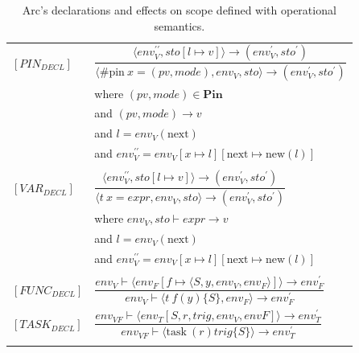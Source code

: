 \begin{table}[htb!]
    \centering
    \begin{tabular}{ll}
        \toprule
        $[PIN_{DECL}]$  & $\dfrac
            {\langle env^{\prime\prime}_V, sto[l \mapsto v] \rangle \rightarrow (env^\prime_V, sto^\prime)}
            {\langle \text{\#pin} \ x = (pv, mode), env_V, sto\rangle\rightarrow (env^\prime_V, sto^\prime)}$ \\ [12pt]
                        & where $(pv, mode) \in \textbf{Pin} $                                                \\
                        & and $(pv,mode) \rightarrow v $                                                      \\
                        & and $l = env_V(\text{next})$                                                        \\
                        & and $env^{\prime\prime}_V = env_V[x \mapsto l][\text{next} \mapsto \text{new}(l)] $ \\
        \\

        $[VAR_{DECL}]$  & $\dfrac
            {\langle env^{\prime\prime}_V, sto[l \mapsto v] \rangle \rightarrow (env^\prime_V, sto^\prime)}
            {\langle t \ x = expr, env_V, sto\rangle\rightarrow (env^\prime_V, sto^\prime)}$                  \\ [12pt]
                        & where $env_V, sto \vdash expr \rightarrow v $                                       \\
                        & and $l = env_V(\text{next})$                                                        \\
                        & and $env^{\prime\prime}_V = env_V[x \mapsto l][\text{next} \mapsto \text{new}(l)] $ \\
        \\

        $[FUNC_{DECL}]$ & $\dfrac
            {env_V \vdash \langle env_F[f \mapsto \langle S, y, env_V, env_F\rangle] \rangle \rightarrow env^\prime_F}
            {env_V \vdash \langle t \ f (y) \{S \}, env_F \rangle \rightarrow env^\prime_F}$                  \\ [12pt]

        $[TASK_{DECL}]$ & $\dfrac
            {env_{VF}\vdash \langle env_T[S, r, trig, env_V, envF] \rangle \rightarrow env^\prime_T}
            {env_{VF}\vdash \langle \text{task} \ (r) trig \{S\} \rangle \rightarrow env^\prime_T}$           \\
        \\
        \bottomrule
    \end{tabular}
    \caption{Arc's declarations and effects on scope defined with operational semantics.}
    \label{tab:arcscoperules}
\end{table}


